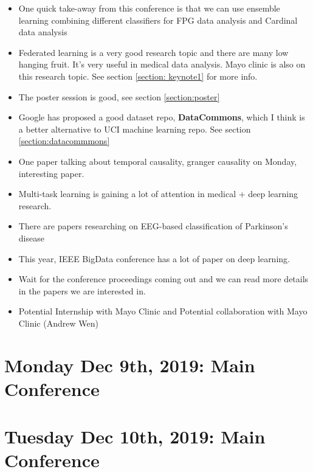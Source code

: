 \documentclass[11pt]{article}
\begin{document}
\begin{itemize}
    \item One quick take-away from this conference is that we can use ensemble learning combining different classifiers for FPG data analysis and Cardinal data analysis
    \item Federated learning is a very good research topic and there are many low hanging fruit. It's very useful in medical data analysis. Mayo clinic is also on this research topic. See section \ref{section: keynote1} for more info.
    \item The poster session is good, see section \ref{section:poster}
    \item Google has proposed a good dataset repo, {\bf DataCommons}, which I think is a better alternative to UCI machine learning repo. See section \ref{section:datacommmons}
    \item One paper talking about temporal causality, granger causality on Monday, interesting paper.
    \item Multi-task learning is gaining a lot of attention in medical + deep learning research.
    \item There are papers researching on EEG-based classification of Parkinson's disease
    \item This year, IEEE BigData conference has a lot of paper on deep learning.
    \item Wait for the conference proceedings coming out and we can read more details in the papers we are interested in.
    \item Potential Internship with Mayo Clinic and Potential collaboration with Mayo Clinic (Andrew Wen)

    
\end{itemize}{}






\newpage
\section{Monday Dec 9th, 2019: Main Conference}


\newpage
\section{Tuesday Dec 10th, 2019: Main Conference}

\end{document}
